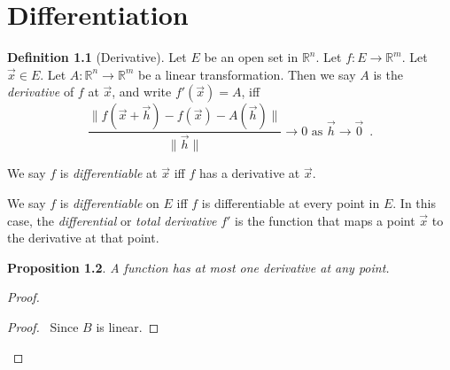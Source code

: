 \documentclass{book}
\let\qed\relax
\newtheorem{prop}{Proposition}[chapter]
\theoremstyle{definition}
\newtheorem{df}[prop]{Definition}
\begin{document}
\chapter{Differentiation}

\begin{df}[Derivative]
Let $E$ be an open set in $\mathbb{R}^n$. Let $f : E \rightarrow \mathbb{R}^m$. Let $\vec{x} \in E$. Let $A : \mathbb{R}^n \rightarrow \mathbb{R}^m$ be a linear transformation. Then we say $A$ is the \emph{derivative} of $f$ at $\vec{x}$, and write $f'(\vec{x}) = A$, iff
\[ \frac{\| f(\vec{x} + \vec{h}) - f(\vec{x}) - A(\vec{h}) \|}{\| \vec{h} \|} \rightarrow 0 \text{ as } \vec{h} \rightarrow \vec{0} \enspace . \]

We say $f$ is \emph{differentiable} at $\vec{x}$ iff $f$ has a derivative at $\vec{x}$.

We say $f$ is \emph{differentiable} on $E$ iff $f$ is differentiable at every point in $E$. In this case, the \emph{differential} or \emph{total derivative} $f'$ is the function that maps a point $\vec{x}$ to the derivative at that point.
\end{df}

\begin{prop}
A function has at most one derivative at any point.
\end{prop}

\begin{proof}
\pf
{}
\begin{proof}
	\pf\ Since $B$ is linear.
\end{proof}
\qed
\end{proof}
\end{document}
